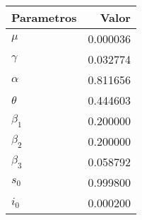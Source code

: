 \begin{tabular}{lr}
\toprule
Parametros &    Valor \\
\midrule
     $\mu$ & 0.000036 \\
  $\gamma$ & 0.032774 \\
  $\alpha$ & 0.811656 \\
  $\theta$ & 0.444603 \\
 $\beta_1$ & 0.200000 \\
 $\beta_2$ & 0.200000 \\
 $\beta_3$ & 0.058792 \\
     $s_0$ & 0.999800 \\
     $i_0$ & 0.000200 \\
\bottomrule
\end{tabular}
